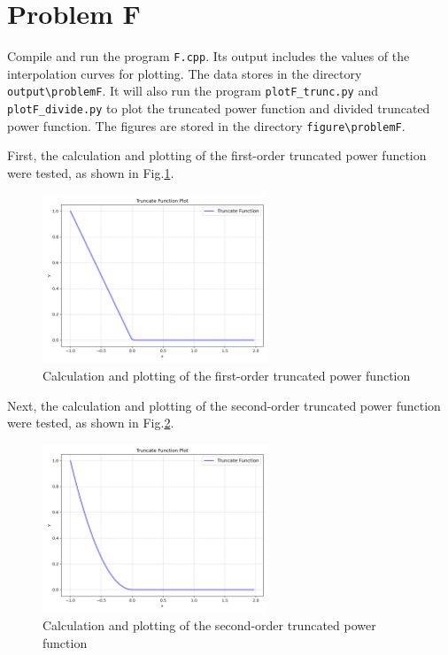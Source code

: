 \documentclass[a4paper]{article}
\begin{document}
\begin{sloppypar}
\section{Problem F}
Compile and run the program \verb|F.cpp|. Its output includes the values of the interpolation curves for plotting. The data stores in the directory \verb|output\problemF|.
It will also run the program \verb|plotF_trunc.py| and \verb|plotF_divide.py| to plot the truncated power function and divided truncated power function. The figures are stored in the directory \verb|figure\problemF|.

First, the calculation and plotting of the first-order truncated power function
were tested, as shown in Fig.\ref{fig:trunc_power_1}.
\begin{figure}[H]
  \centering
  \includegraphics[width=0.6\textwidth]{../figure/problemF/trunc_1.png}
  \renewcommand{\figurename}{Fig.}
  \caption{Calculation and plotting of the first-order truncated power function}
  \label{fig:trunc_power_1}
\end{figure}

Next, the calculation and plotting of the second-order truncated power function
were tested, as shown in Fig.\ref{fig:trunc_power_2}.
\begin{figure}[H]
  \centering
  \includegraphics[width=0.6\textwidth]{../figure/problemF/trunc_2.png}
  \renewcommand{\figurename}{Fig.}
  \caption{Calculation and plotting of the second-order truncated power function}
  \label{fig:trunc_power_2}
\end{figure}


\end{sloppypar}
\end{document}
